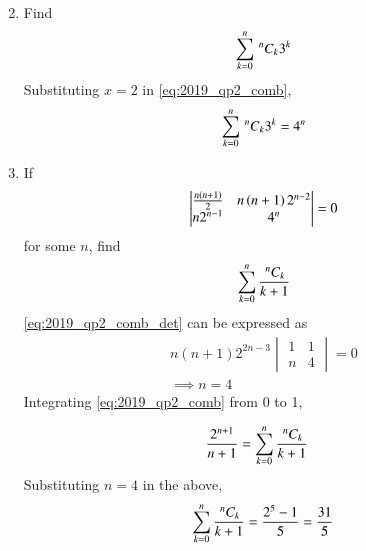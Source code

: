\begin{enumerate}[label=\arabic*.,ref=\thesubsection.\theenumi]
\begin{align}
\end{align}
\item Find 
\begin{align}
\label{eq:2019_qp2_comb_3k}
\sum_{k=0}^{n}\,^{n}C_{k}3^k
\end{align}
\solution Substituting $x=2$ in \eqref{eq:2019_qp2_comb},
\begin{align}
\label{eq:2019_qp2_comb_3k_sol}
\sum_{k=0}^{n}\,^{n}C_{k}3^k = 4^n
\end{align}
\item If
\begin{align}
\label{eq:2019_qp2_comb_det}
\begin{vmatrix}
\frac{n(n+1)}{2} & n\left(n+1\right)2^{n-2}
\\
n2^{n-1} & 4^n
\end{vmatrix} = 0
\end{align}
for some $n$, find 
\begin{align}
\label{eq:2019_qp2_comb_det_prob}
\sum_{k=0}^{n}\frac{\,^{n}C_{k}}{k+1}
\end{align}
%
\solution \eqref{eq:2019_qp2_comb_det} can be expressed as
\begin{align}
\label{eq:2019_qp2_comb_det_sol}
n(n+1)2^{2n-3}
\begin{vmatrix}
1 & 1
\\
n & 4
\end{vmatrix} = 0
\\
\implies n = 4
\end{align}
%
Integrating \eqref{eq:2019_qp2_comb} from 0 to 1,

\begin{align}
\label{eq:2019_qp2_comb_int}
\frac{2^{n+1}}{n+1}&=\sum_{k=0}^{n}\frac{\,^{n}C_{k}}{k+1}
\end{align}
%
Substituting $n=4$ in the above, 
\begin{align}
\label{eq:2019_qp2_comb_int_sol}
\sum_{k=0}^{n}\frac{\,^{n}C_{k}}{k+1}= \frac{2^{5}-1}{5} = \frac{31}{5}
\end{align}
\end{enumerate}
%
